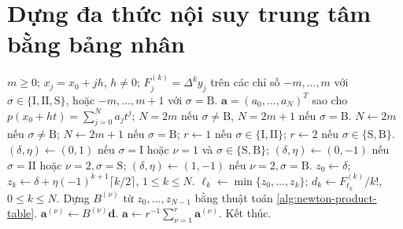 \documentclass[12pt,a4paper,oneside]{book}
\numberwithin{algorithm}{chapter}
\theoremstyle{definition}
\begin{document}
\section{Dựng đa thức nội suy trung tâm bằng bảng nhân}
\begin{algorithm}[H]
\caption{Đa thức Gauss, Stirling hoặc Bessel: sơ lược}
\label{alg:central-polynomial-short}
\begin{algorithmic}[1]
\Require $m\geq0$; $x_j=x_0+jh$, $h\ne0$; $F_j^{(k)}=\Delta^ky_j$ trên các chỉ số $-m,\ldots,m$ với $\sigma\in\{\mathrm I,\mathrm{II},\mathrm S\}$, hoặc $-m,\ldots,m+1$ với $\sigma=\mathrm B$.
\Ensure $\boldsymbol a=(a_0,\ldots,a_N)^T$ sao cho $p(x_0+ht)=\sum_{j=0}^{N}a_jt^j$; $N=2m$ nếu $\sigma\ne\mathrm B$, $N=2m+1$ nếu $\sigma=\mathrm B$.
\State $N\gets2m$ nếu $\sigma\ne\mathrm B$; $N\gets2m+1$ nếu $\sigma=\mathrm B$; $r\gets1$ nếu $\sigma\in\{\mathrm I,\mathrm{II}\}$; $r\gets2$ nếu $\sigma\in\{\mathrm S,\mathrm B\}$.
 \State $(\delta,\eta)\gets(0,1)$ nếu $\sigma=\mathrm I$ hoặc $\nu=1$ và $\sigma\in\{\mathrm S,\mathrm B\}$; $(\delta,\eta)\gets(0,-1)$ nếu $\sigma=\mathrm{II}$ hoặc $\nu=2,\sigma=\mathrm S$; $(\delta,\eta)\gets(1,-1)$ nếu $\nu=2,\sigma=\mathrm B$.
 \State $z_0\gets\delta$; $z_k\gets\delta+\eta(-1)^{k+1}\lceil k/2\rceil$, $1\leq k\leq N$.
 \State $\ell_k\gets\min\{z_0,\ldots,z_k\}$; $d_k\gets F_{\ell_k}^{(k)}/k!$, $0\leq k\leq N$.
 \State Dựng $B^{(\nu)}$ từ $z_0,\ldots,z_{N-1}$ bằng thuật toán \ref{alg:newton-product-table}.
 \State $\boldsymbol a^{(\nu)}\gets B^{(\nu)}\boldsymbol d$.
\EndFor
\Statex
\State $\boldsymbol a\gets r^{-1}\sum_{\nu=1}^{r}\boldsymbol a^{(\nu)}$.
\State Kết thúc.
\end{algorithmic}
\end{algorithm}
\end{document}
